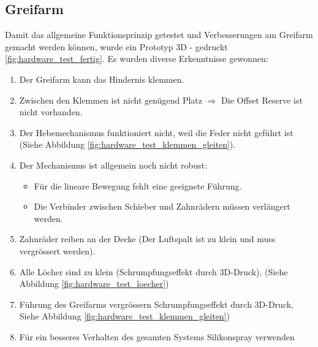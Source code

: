 \documentclass[../main.tex]{subfiles}
\begin{document}
\subsection{Greifarm} \label{sec:hardware_greifarm}
Damit das allgemeine Funktionsprinzip getestet und Verbesserungen am Greifarm gemacht werden können, wurde ein Prototyp 3D - gedruckt \ref{fig:hardware_test_fertig}. Es wurden diverse Erkenntnisse gewonnen:

\begin{enumerate}
    \item Der Greifarm kann das Hindernis klemmen.
    \item Zwischen den Klemmen ist nicht genügend Platz $\Rightarrow$ Die Offset Reserve ist nicht vorhanden.
    \item Der Hebemechanismus funktioniert nicht, weil die Feder nicht geführt ist (Siehe Abbildung \ref{fig:hardware_test_klemmen_gleiten}).
    \item Der Mechanismus ist allgemein noch nicht robust:
    \begin{itemize}
        \item Für die lineare Bewegung fehlt eine geeignete Führung.
        \item Die Verbinder zwischen Schieber und Zahnrädern müssen verlängert werden.
    \end{itemize}
    \item Zahnräder reiben an der Decke (Der Luftspalt ist zu klein und muss vergrössert werden).
    \item Alle Löcher sind zu klein (Schrumpfungseffekt durch 3D-Druck). (Siehe Abbildung \ref{fig:hardware_test_loecher})
    \item Führung des Greifarms vergrössern Schrumpfungseffekt durch 3D-Druck, Siehe Abbildung \ref{fig:hardware_test_klemmen_gleiten})
    \item Für ein besseres Verhalten des gesamten Systems Silikonspray verwenden
\end{enumerate}
\end{document}
